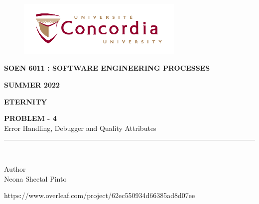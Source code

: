 \documentclass[letterpaper, 11pt]{article}
\begin{document}
\begin{titlepage}
\vspace*{0.7in}
\begin{center}
\begin{figure}[htb]
\begin{center}
\includegraphics[width=8cm]{univ_logo}
\end{center}
\end{figure}
\vspace*{0.3in}
\begin{Large}
\textbf{SOEN 6011 : SOFTWARE ENGINEERING PROCESSES} \\
\end{Large}
\vspace*{0.1in}
\begin{Large}
\textbf{SUMMER 2022} \\
\end{Large}
\vspace*{0.9in}
\begin{Large}
\textbf{ETERNITY} \\
\end{Large}
\vspace*{0.9in}
\begin{Large} 
\textbf{PROBLEM - 4} \\
Error Handling, Debugger and Quality Attributes\\
\end{Large}
\vspace*{0.625in}
\rule{80mm}{0.1mm}\\
\vspace*{0.1in}
\begin{large}
Author \\
\vspace*{0.1in}
Neona Sheetal Pinto\\
\vspace*{1.0in}
\date{\normalsize\today} 
\end{large}
\end{center}
\begin{center}
https://www.overleaf.com/project/62ec550934d66385ad8d07ee\end{center}
\end{titlepage}
\end{document}
